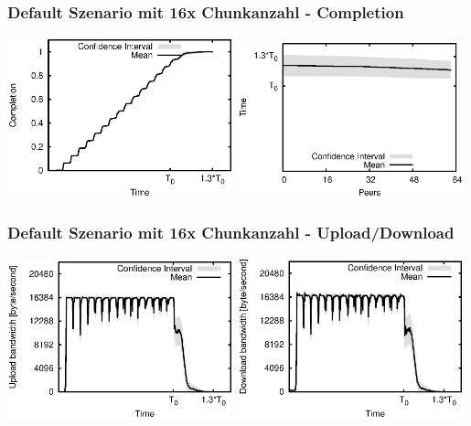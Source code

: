 \begin{frame}
  \frametitle{Default Szenario mit 16x Chunkanzahl - Completion}
  \begin{center}
    \includegraphics[width=0.49\textwidth]{fig/plots/scenario_17_chunk_count_fac_16/plots/GeneratedMeanChunkCompletion.csv.eps}
    \hfill
    \includegraphics[width=0.49\textwidth]{fig/plots/scenario_17_chunk_count_fac_16/plots/GeneratedMeanSortedChunkCompletion.csv.eps}
  \end{center}
\end{frame}


\begin{frame}
  \frametitle{Default Szenario mit 16x Chunkanzahl - Upload/Download}
  \begin{center}
    \includegraphics[width=0.49\textwidth]{fig/plots/scenario_17_chunk_count_fac_16/plots/GeneratedMeanCurrentUploadBandwidth.csv.eps}
    \includegraphics[width=0.49\textwidth]{fig/plots/scenario_17_chunk_count_fac_16/plots/GeneratedMeanCurrentDownloadBandwidth.csv.eps}
  \end{center}
\end{frame}



